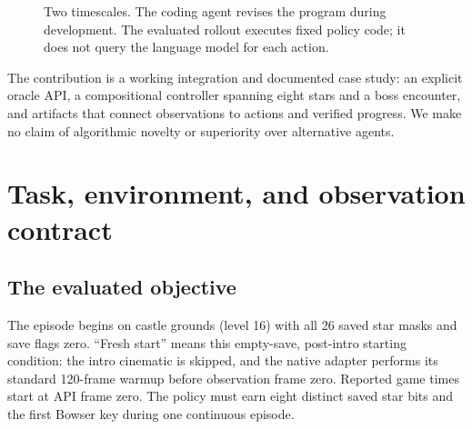 \documentclass[10pt,letterpaper]{article}
\begin{document}
\begin{figure}[h]
\centering
{}
\caption{Two timescales. The coding agent revises the program during development. The evaluated rollout executes fixed policy code; it does not query the language model for each action.}
\end{figure}

The contribution is a working integration and documented case study: an explicit oracle API, a compositional controller spanning eight stars and a boss encounter, and artifacts that connect observations to actions and verified progress. We make no claim of algorithmic novelty or superiority over alternative agents.

\clearpage
\section{Task, environment, and observation contract}
\subsection{The evaluated objective}
The episode begins on castle grounds (level 16) with all 26 saved star masks and save flags zero. ``Fresh start'' means this empty-save, post-intro starting condition: the intro cinematic is skipped, and the native adapter performs its standard 120-frame warmup before observation frame zero. Reported game times start at API frame zero. The policy must earn eight distinct saved star bits and the first Bowser key during one continuous episode.
\end{document}

